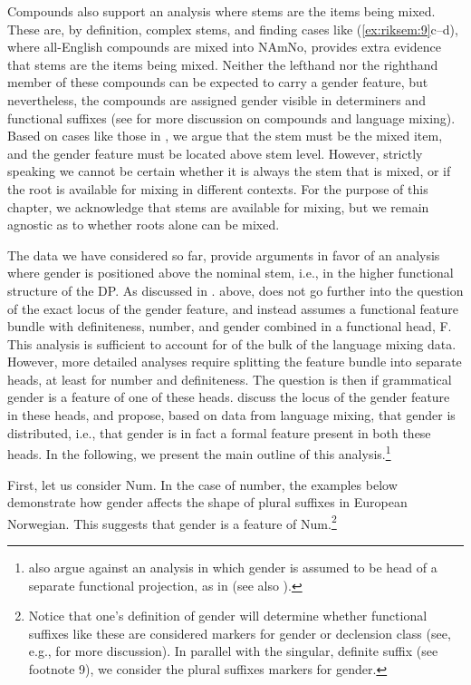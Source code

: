 \documentclass[output=paper]{langscibook}
\begin{document}
Compounds also support an analysis where stems are the items being mixed. These are, by definition, complex stems, and finding cases like (\ref{ex:riksem:9}c–d), where all-English compounds are mixed into NAmNo, provides extra evidence that stems are the items being mixed. Neither the lefthand nor the righthand member of these compounds can be expected to carry a gender feature, but nevertheless, the compounds are assigned gender visible in determiners and functional suffixes (see \citealt{EikRiksem2022} for more discussion on compounds and language mixing). Based on cases like those in , we argue that the stem must be the mixed item, and the gender feature must be located above stem level. However, strictly speaking we cannot be certain whether it is always the stem that is mixed, or if the root is available for mixing in different contexts. For the purpose of this chapter, we acknowledge that stems are available for mixing, but we remain agnostic as to whether roots alone can be mixed.



The data we have considered so far, provide arguments in favor of an analysis where gender is positioned above the nominal stem, i.e., in the higher functional structure of the DP. As discussed in . above, \citet{Riksem2018Language} does not go further into the question of the exact locus of the gender feature, and instead assumes a functional feature bundle with definiteness, number, and gender combined in a functional head, F. This analysis is sufficient to account for of the bulk of the language mixing data. However, more detailed analyses require splitting the feature bundle into separate heads, at least for number and definiteness. The question is then if grammatical gender is a feature of one of these heads. \citet{ÅfarliEtAl2021} discuss the locus of the gender feature in these heads, and propose, based on data from language mixing, that gender is distributed, i.e., that gender is in fact a formal feature present in both these heads. In the following, we present the main outline of this analysis.\footnote{\citet{ÅfarliEtAl2021} also argue against an analysis in which gender is assumed to be head of a separate functional projection, as in \citet{Picallo1991} (see also \citealt{Ritter1993, Kramer2015}).}



First, let us consider Num. In the case of number, the examples below demonstrate how gender affects the shape of plural suffixes in European Norwegian. This suggests that gender is a feature of Num.\footnote{Notice that one’s definition of gender will determine whether functional suffixes like these are considered markers for gender or declension class (see, e.g., \citealt{Enger2004} for more discussion). In parallel with the singular, definite suffix (see footnote 9), we consider the plural suffixes markers for gender.}
\end{document}
